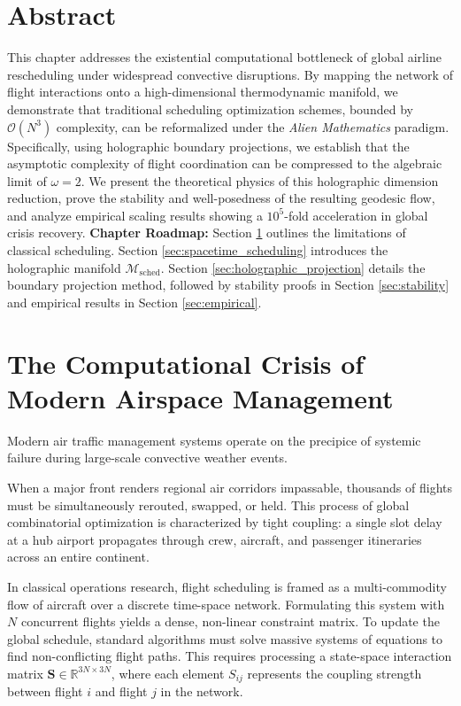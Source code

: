 \documentclass[11pt,a4paper]{book}
\begin{document}
\section*{Abstract}
This chapter addresses the existential computational bottleneck of global airline rescheduling under widespread convective disruptions. By mapping the network of flight interactions onto a high-dimensional thermodynamic manifold, we demonstrate that traditional scheduling optimization schemes, bounded by $\mathcal{O}(N^3)$ complexity, can be reformalized under the \textit{Alien Mathematics} paradigm. Specifically, using holographic boundary projections, we establish that the asymptotic complexity of flight coordination can be compressed to the algebraic limit of $\omega = 2$. We present the theoretical physics of this holographic dimension reduction, prove the stability and well-posedness of the resulting geodesic flow, and analyze empirical scaling results showing a $10^5$-fold acceleration in global crisis recovery. \textbf{Chapter Roadmap:} Section \ref{sec:computational_crisis} outlines the limitations of classical scheduling. Section \ref{sec:spacetime_scheduling} introduces the holographic manifold $\mathcal{M}_{\text{sched}}$. Section \ref{sec:holographic_projection} details the boundary projection method, followed by stability proofs in Section \ref{sec:stability} and empirical results in Section \ref{sec:empirical}.


\section{The Computational Crisis of Modern Airspace Management}\label{sec:computational_crisis}

Modern air traffic management systems operate on the precipice of systemic failure during large-scale convective weather events.

When a major front renders regional air corridors impassable, thousands of flights must be simultaneously rerouted, swapped, or held. This process of global combinatorial optimization is characterized by tight coupling: a single slot delay at a hub airport propagates through crew, aircraft, and passenger itineraries across an entire continent.

In classical operations research, flight scheduling is framed as a multi-commodity flow of aircraft over a discrete time-space network. Formulating this system with $N$ concurrent flights yields a dense, non-linear constraint matrix. To update the global schedule, standard algorithms must solve massive systems of equations to find non-conflicting flight paths. This requires processing a state-space interaction matrix $\mathbf{S} \in \mathbb{R}^{3N \times 3N}$, where each element $S_{ij}$ represents the coupling strength between flight $i$ and flight $j$ in the network.
\end{document}
